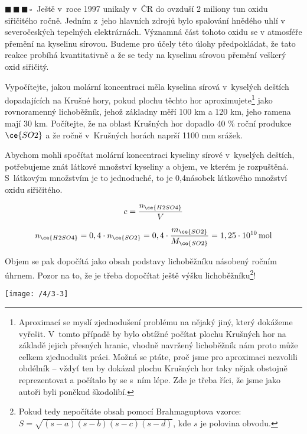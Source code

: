 \documentclass{book}
\newcommand{\tri}{$\blacksquare \, \blacksquare \, \blacksquare \, \square \; \; $}
\renewenvironment{quotation}{\par}{\par} %
\begin{document}
\hrulefill %
\begin{quotation}
\tri Ještě v~roce 1997 unikaly v~ČR do ovzduší 2 miliony tun oxidu siřičitého
ročně. Jedním z~jeho hlavních zdrojů bylo spalování hnědého uhlí v
severočeských tepelných elektrárnách. Významná část tohoto oxidu se
v atmosféře přemění na kyselinu sírovou. Budeme pro účely této úlohy předpokládat, že tato
reakce probíhá kvantitativně a že se tedy na kyselinu sírovou přemění veškerý oxid siřičitý.

Vypočítejte, jakou molární koncentraci
měla kyselina sírová v~kyselých deštích dopadajících na Krušné hory,
pokud plochu těchto hor aproximujete\footnote{Aproximací se myslí zjednodušení problému na nějaký jiný, který dokážeme vyřešit. V~tomto případě by bylo obtížné počítat plochu Krušných hor na základě jejich přesných hranic, vhodně navržený lichoběžník nám proto může celkem zjednodušit práci. Možná se ptáte, proč jsme pro aproximaci nezvolili obdélník -- vždyť ten by dokázal plochu Krušných hor taky nějak obstojně reprezentovat a počítalo by se s~ním lépe. Zde je třeba říci, že jsme jako autoři byli poněkud škodolibí.} jako rovnoramenný lichoběžník,
jehož základny měří 100 km a 120 km, jeho ramena mají 30 km. Počítejte,
že na oblast Krušných hor dopadlo 40 \% roční produkce $\ce{SO2}$
a že ročně v~Krušných horách naprší 1100 mm srážek.
\end{quotation} \dotfill \par 
Abychom mohli spočítat molární koncentraci kyseliny sírové v~kyselých
deštích, potřebujeme znát látkové množství kyseliny a objem, ve kterém
je rozpuštěná. S~látkovým množstvím je to jednoduché, to je 0,4násobek
látkového množství oxidu siřičitého. 

\[
c=\frac{n_{\ce{H2SO4}}}{V}
\]

\[
n_{\ce{H2SO4}}=0,4\cdot n_{\ce{SO2}}=0,4\cdot\frac{m_{\ce{SO2}}}{M_{\ce{SO2}}}=1,25\cdot10^{10}\,\mathrm{mol}
\]

\newpage %

Objem se pak dopočítá jako obsah
podstavy lichoběžníku násobený ročním úhrnem. Pozor na to, že je třeba
dopočítat ještě výšku lichoběžníku\footnote{Pokud tedy nepočítáte obsah pomocí Brahmaguptova vzorce: $S=\sqrt{(s-a)(s-b)(s-c)(s-d)}$,
kde $s$ je polovina obvodu.}!
\begin{center}
\texttt{[image: /4/3-3]}
\par\end{center}
\end{document}
